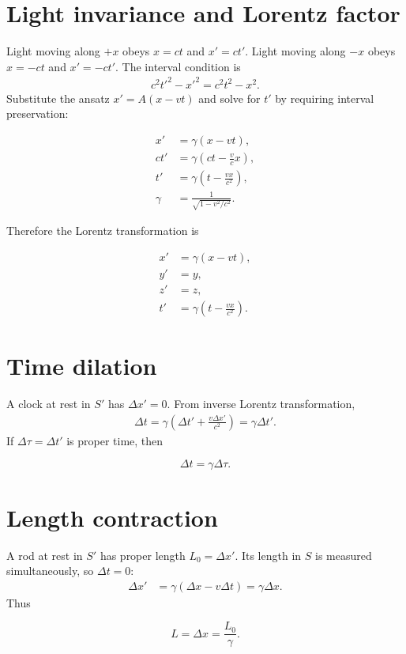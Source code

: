 \documentclass[11pt,a4paper]{article}
\begin{document}
\section{Light invariance and Lorentz factor}
Light moving along $+x$ obeys $x=ct$ and $x'=ct'$. Light moving along $-x$ obeys $x=-ct$ and $x'=-ct'$. The interval condition is
\begin{align}
c^2t'^2-x'^2=c^2t^2-x^2.
\end{align}
Substitute the ansatz $x'=A(x-vt)$ and solve for $t'$ by requiring interval preservation:
\begin{derivationbox}
\begin{align}
x'&=\gamma(x-vt),\\
ct'&=\gamma\left(ct-\frac{v}{c}x\right),\\
t'&=\gamma\left(t-\frac{vx}{c^2}\right),\\
\gamma&=\frac{1}{\sqrt{1-v^2/c^2}}.
\end{align}
\end{derivationbox}
Therefore the Lorentz transformation is
\begin{resultbox}
\begin{align}
x'&=\gamma(x-vt),\\
y'&=y,\\
z'&=z,\\
t'&=\gamma\left(t-\frac{vx}{c^2}\right).
\end{align}
\end{resultbox}

\section{Time dilation}
A clock at rest in $S'$ has $\Delta x'=0$. From inverse Lorentz transformation,
\begin{align}
\Delta t=\gamma\left(\Delta t'+\frac{v\Delta x'}{c^2}\right)=\gamma\Delta t'.
\end{align}
If $\Delta\tau=\Delta t'$ is proper time, then
\begin{resultbox}
\[
\Delta t=\gamma\Delta\tau.
\]
\end{resultbox}

\section{Length contraction}
A rod at rest in $S'$ has proper length $L_0=\Delta x'$. Its length in $S$ is measured simultaneously, so $\Delta t=0$:
\begin{align}
\Delta x' &= \gamma(\Delta x-v\Delta t)=\gamma\Delta x.
\end{align}
Thus
\begin{resultbox}
\[
L=\Delta x=\frac{L_0}{\gamma}.
\]
\end{resultbox}
\end{document}
